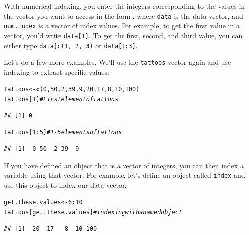 \documentclass{tufte-book}\usepackage[]{graphicx}\usepackage[]{color}
\makeatletter
\newcommand{\hlnum}[1]{\textcolor[rgb]{0.686,0.059,0.569}{#1}}%
\newcommand{\hlcom}[1]{\textcolor[rgb]{0.678,0.584,0.686}{\textit{#1}}}%
\newcommand{\hlopt}[1]{\textcolor[rgb]{0,0,0}{#1}}%
\newcommand{\hlstd}[1]{\textcolor[rgb]{0.345,0.345,0.345}{#1}}%
\newcommand{\hlkwb}[1]{\textcolor[rgb]{0.69,0.353,0.396}{#1}}%
\newcommand{\hlkwd}[1]{\textcolor[rgb]{0.737,0.353,0.396}{\textbf{#1}}}%
\newenvironment{kframe}{%
 \def\at@end@of@kframe{}%
 \ifinner\ifhmode%
  \def\at@end@of@kframe{\end{minipage}}%
  \begin{minipage}{\columnwidth}%
 \fi\fi%
 \def\FrameCommand##1{\hskip\@totalleftmargin \hskip-\fboxsep
 \colorbox{shadecolor}{##1}\hskip-\fboxsep
     \hskip-\linewidth \hskip-\@totalleftmargin \hskip\columnwidth}%
 \MakeFramed {\advance\hsize-\width
   \@totalleftmargin\z@ \linewidth\hsize
   \@setminipage}}%
 {\par\unskip\endMakeFramed%
 \at@end@of@kframe}
\newenvironment{knitrout}{}{} %
\makeatother
\begin{document}
With numerical indexing, you enter the integers corresponding to the values in the vector you want to access in the form , where \texttt{data} is the data vector, and \texttt{num.index} is a vector of index values. For example, to get the first value in a vector, you'd write \texttt{data[1]}. To get the first, second, and third value, you can either type \texttt{data[c(1, 2, 3)} or \texttt{data[1:3]}.

Let's do a few more examples. We'll use the \texttt{tattoos} vector again and use indexing to extract specific values:


\begin{knitrout}
\color{fgcolor}\begin{kframe}
\begin{alltt}
\hlstd{tattoos} \hlkwb{<-} \hlkwd{c}\hlstd{(}\hlnum{0}\hlstd{,} \hlnum{50}\hlstd{,} \hlnum{2}\hlstd{,} \hlnum{39}\hlstd{,} \hlnum{9}\hlstd{,} \hlnum{20}\hlstd{,} \hlnum{17}\hlstd{,} \hlnum{8}\hlstd{,} \hlnum{10}\hlstd{,} \hlnum{100}\hlstd{)}
\hlstd{tattoos[}\hlnum{1}\hlstd{]} \hlcom{# First element of tattoos}
\end{alltt}
\begin{verbatim}
## [1] 0
\end{verbatim}
\begin{alltt}
\hlstd{tattoos[}\hlnum{1}\hlopt{:}\hlnum{5}\hlstd{]} \hlcom{# 1-5 elements of tattoos}
\end{alltt}
\begin{verbatim}
## [1]  0 50  2 39  9
\end{verbatim}
\end{kframe}
\end{knitrout}

If you have defined an object that is a vector of integers, you can then index a variable using that vector. For example, let's define an object called \texttt{index} and use this object to index our data vector:


\begin{knitrout}
\color{fgcolor}\begin{kframe}
\begin{alltt}
\hlstd{get.these.values} \hlkwb{<-} \hlnum{6}\hlopt{:}\hlnum{10}
\hlstd{tattoos[get.these.values]} \hlcom{# Indexing with a named object}
\end{alltt}
\begin{verbatim}
## [1]  20  17   8  10 100
\end{verbatim}
\end{kframe}
\end{knitrout}
\end{document}
